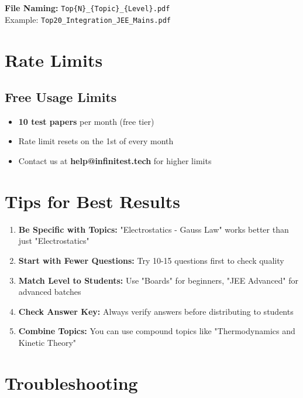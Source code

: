 \documentclass[11pt,a4paper]{article}
\begin{document}
\textbf{File Naming:} \texttt{Top\{N\}\_\{Topic\}\_\{Level\}.pdf}\\
Example: \texttt{Top20\_Integration\_JEE\_Mains.pdf}

\section{Rate Limits}

\subsection{Free Usage Limits}

\begin{itemize}[leftmargin=*]
    \item \textbf{10 test papers} per month (free tier)
    \item Rate limit resets on the 1st of every month
    \item Contact us at \textbf{help@infinitest.tech} for higher limits
\end{itemize}

\section{Tips for Best Results}

\begin{enumerate}[leftmargin=*]
    \item \textbf{Be Specific with Topics:} "Electrostatics - Gauss Law" works better than just "Electrostatics"
    \item \textbf{Start with Fewer Questions:} Try 10-15 questions first to check quality
    \item \textbf{Match Level to Students:} Use "Boards" for beginners, "JEE Advanced" for advanced batches
    \item \textbf{Check Answer Key:} Always verify answers before distributing to students
    \item \textbf{Combine Topics:} You can use compound topics like "Thermodynamics and Kinetic Theory"
\end{enumerate}

\section{Troubleshooting}
\end{document}
